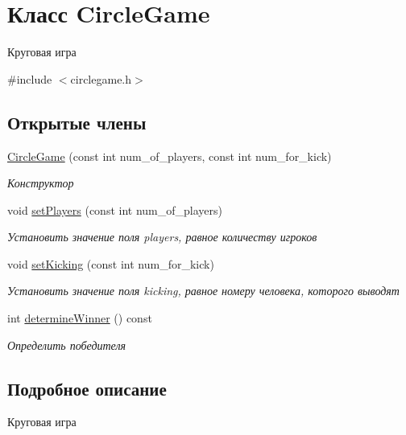 \hypertarget{classCircleGame}{}\section{Класс Circle\+Game}
\label{classCircleGame}


Круговая игра  




{\ttfamily \#include $<$circlegame.\+h$>$}

\subsection*{Открытые члены}
\begin{DoxyCompactItemize}
\item 
\hyperlink{classCircleGame_a9d897a36adf928cf37476a49e010e7d2}{Circle\+Game} (const int num\+\_\+of\+\_\+players, const int num\+\_\+for\+\_\+kick)
\begin{DoxyCompactList}\small\item\em Конструктор \end{DoxyCompactList}\item 
void \hyperlink{classCircleGame_a2ce615aea3a1beea3fa059e860996e69}{set\+Players} (const int num\+\_\+of\+\_\+players)
\begin{DoxyCompactList}\small\item\em Установить значение поля players, равное количеству игроков \end{DoxyCompactList}\item 
void \hyperlink{classCircleGame_a43b7edb3125634862d39244d83e3b24b}{set\+Kicking} (const int num\+\_\+for\+\_\+kick)
\begin{DoxyCompactList}\small\item\em Установить значение поля kicking, равное номеру человека, которого выводят \end{DoxyCompactList}\item 
int \hyperlink{classCircleGame_ae7d1d1a2d931b050130ff469031aac64}{determine\+Winner} () const 
\begin{DoxyCompactList}\small\item\em Определить победителя \end{DoxyCompactList}\end{DoxyCompactItemize}


\subsection{Подробное описание}
Круговая игра 

